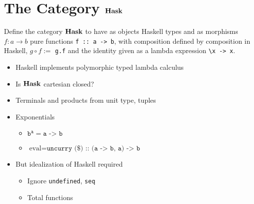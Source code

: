 \section{The Category $\mathbf{Hask}$}

\frame{\tableofcontents[currentsection]}

\begin{frame}[fragile]
    \begin{definition}
        Define the category $\mathbf{Hask}$ to have as objects Haskell types and as
        morphisms $f: a \to b$ pure functions \verb|f :: a -> b|, with
        composition defined by composition in Haskell, $g \circ f :=$
        \verb|g.f| and the identity given as a lambda expression
        \verb|\x -> x|.
    \end{definition}
\end{frame}

\begin{frame}[fragile]
    \begin{itemize}
        \item Haskell implements polymorphic typed lambda calculus
        \item Is $\mathbf{Hask}$ cartesian closed?
        \item Terminals and products from unit type, tuples
        \item Exponentials
        \begin{itemize}
            \item $\texttt{b}^\texttt{a} = \texttt{a -> b}$
            \item $\textrm{eval} = \texttt{uncurry (\$) :: (a -> b, a) -> b}$
        \end{itemize}
        \item But idealization of Haskell required
        \begin{itemize}
            \item Ignore \verb|undefined|, \verb|seq|
            \item Total functions
        \end{itemize}
    \end{itemize}
\end{frame}
